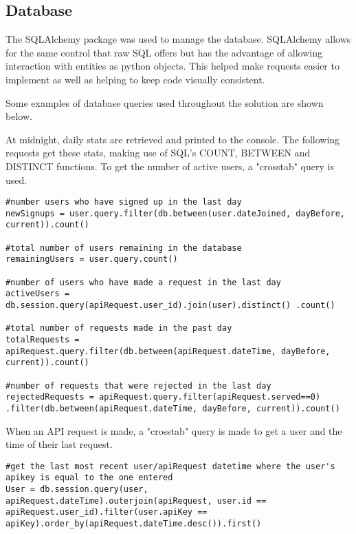         \subsection{Database}

        The SQLAlchemy package was used to manage the database. SQLAlchemy allows for the same control that raw SQL offers but has the advantage of allowing interaction with entities as python objects. This helped make requests easier to implement as well as helping to keep code visually consistent.

        Some examples of database queries used throughout the solution are shown below.

        At midnight, daily stats are retrieved and printed to the console. The following requests get these stats, making use of SQL's COUNT, BETWEEN and DISTINCT functions. To get the number of active users, a "crosstab" query is used.

        \vspace{3mm}
        \begin{verbatim}
#number users who have signed up in the last day
newSignups = user.query.filter(db.between(user.dateJoined, dayBefore, current)).count()

#total number of users remaining in the database
remainingUsers = user.query.count()

#number of users who have made a request in the last day
activeUsers = db.session.query(apiRequest.user_id).join(user).distinct() .count()

#total number of requests made in the past day
totalRequests = apiRequest.query.filter(db.between(apiRequest.dateTime, dayBefore, current)).count()

#number of requests that were rejected in the last day 
rejectedRequests = apiRequest.query.filter(apiRequest.served==0) .filter(db.between(apiRequest.dateTime, dayBefore, current)).count()
        \end{verbatim}
        \vspace{3mm}

        When an API request is made, a "crosstab" query is made to get a user and the time of their last request.

        \vspace{3mm}
        \begin{verbatim}
#get the last most recent user/apiRequest datetime where the user's apikey is equal to the one entered
User = db.session.query(user, apiRequest.dateTime).outerjoin(apiRequest, user.id == apiRequest.user_id).filter(user.apiKey == apiKey).order_by(apiRequest.dateTime.desc()).first()
        \end{verbatim}


